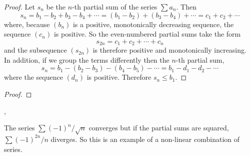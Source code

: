 \documentclass[../MathsNotesBase.tex]{subfiles}
\begin{document}
{		
		\bigskip
		\begin{proof}\nl[3]
			Let $s_n$ be the $n$-th partial sum of the series ${ \sum a_n }$. Then
			\[ s_n = b_1 - b_2 + b_3 - b_4 + \cdots = (b_1 - b_2) + (b_3 - b_4) + \cdots = c_1 + c_2  + \cdots \]
			where, because $(b_n)$ is a positive, monotonically decreasing sequence, the sequence $(c_n)$ is positive. So the even-numbered partial sums take the form
			\[ s_{2n} = c_1 + c_2 + \cdots + c_n \]
			and the subsequence $(s_{2n})$ is therefore positive and monotonically increasing.\\
			
			In addition, if we group the terms differently then the $n$-th partial sum,
			\[ s_n = b_1 - (b_2 - b_3) - (b_4 - b_5) - \cdots = b_1 - d_1 - d_2 - \cdots \]
			where the sequence $(d_n)$ is positive. Therefore ${ s_n \leq b_1 }$. 
		\end{proof}
	
		\bigskip
		\begin{proof}
		\end{proof}
	
		\nl[10]
	
		\sep
		\begin{exe}
			\ex The series ${ \sum (-1)^n/\sqrt{n} }$ converges but if the partial sums are squared, ${ \sum (-1)^{2n}/n }$ diverges. So this is an example of a non-linear combination of series.
			\label{ex:absolutely-convergent-series-whose-square-diverges}
			

\end{exe}}
\end{document}
